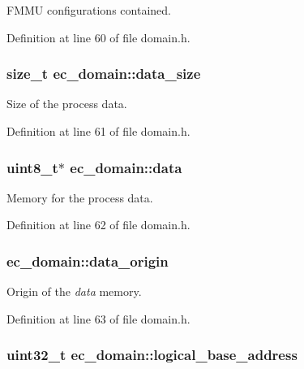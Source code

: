 F\-M\-M\-U configurations contained. 



Definition at line 60 of file domain.\-h.

\subsubsection[{data\-\_\-size}]{\setlength{\rightskip}{0pt plus 5cm}size\-\_\-t ec\-\_\-domain\-::data\-\_\-size}\label{structec__domain_a7c2dfe55da8c96a17ace9de29e8cbb95}


Size of the process data. 



Definition at line 61 of file domain.\-h.

\subsubsection[{data}]{\setlength{\rightskip}{0pt plus 5cm}uint8\-\_\-t$\ast$ ec\-\_\-domain\-::data}\label{structec__domain_ab6ced9980be9d70c0c610cf00e44793d}


Memory for the process data. 



Definition at line 62 of file domain.\-h.

\subsubsection[{data\-\_\-origin}]{ ec\-\_\-domain\-::data\-\_\-origin}\label{structec__domain_a2ff57b73bc954e0ce90f1cee5d0a2721}


Origin of the {\itshape data} memory. 



Definition at line 63 of file domain.\-h.

\subsubsection[{logical\-\_\-base\-\_\-address}]{\setlength{\rightskip}{0pt plus 5cm}uint32\-\_\-t ec\-\_\-domain\-::logical\-\_\-base\-\_\-address}\label{structec__domain_a5efe0cdd408c44ad61c52952f28f14de}


